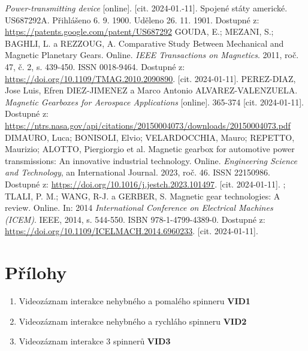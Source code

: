 \documentclass[12pt, a4paper,
 twoside,        %
 openright
]{report}
\begin{document}
\begin{thebibliography}{99}
     \textit{Power-transmitting device} [online]. [cit. 2024-01.-11]. Spojené státy americké. US687292A. Přihlášeno 6. 9. 1900. Uděleno 26. 11. 1901. Dostupné z: \url{https://patents.google.com/patent/US687292}
     GOUDA, E.; MEZANI, S.; BAGHLI, L. a REZZOUG, A. Comparative Study Between Mechanical and Magnetic Planetary Gears. Online. \textit{IEEE Transactions on Magnetics}. 2011, roč. 47, č. 2, s. 439-450. ISSN 0018-9464. Dostupné z: \url{https://doi.org/10.1109/TMAG.2010.2090890}. [cit. 2024-01-11].
     PEREZ-DIAZ, Jose Luis, Efren DIEZ-JIMENEZ a Marco Antonio ALVAREZ-VALENZUELA. \textit{Magnetic Gearboxes for Aerospace Applications} [online]. 365-374 [cit. 2024-01-11]. Dostupné z: \url{https://ntrs.nasa.gov/api/citations/20150004073/downloads/20150004073.pdf}
     DIMAURO, Luca; BONISOLI, Elvio; VELARDOCCHIA, Mauro; REPETTO, Maurizio; ALOTTO, Piergiorgio et al. Magnetic gearbox for automotive power transmissions: An innovative industrial technology. Online. \textit{Engineering Science and Technology}, an International Journal. 2023, roč. 46. ISSN 22150986. Dostupné z: \url{https://doi.org/10.1016/j.jestch.2023.101497}. [cit. 2024-01-11].
;    TLALI, P. M.; WANG, R-J. a GERBER, S. Magnetic gear technologies: A review. Online. In: 2014 \textit{International Conference on Electrical Machines (ICEM)}. IEEE, 2014, s. 544-550. ISBN 978-1-4799-4389-0. Dostupné z: \url{https://doi.org/10.1109/ICELMACH.2014.6960233}. [cit. 2024-01-11].
\end{thebibliography}

\listoffigures

\listoftables

\lstlistoflistings


\chapter*{Přílohy}
\begin{enumerate}[topsep=0pt, partopsep=0pt]
    \setlength{\itemsep}{0pt}%
    \setlength{\parskip}{0pt}%
    \item \label{attachment_1} Videozáznam interakce nehybného a pomalého spinneru \dotfill \textbf{VID1}
    \item \label{attachment_2} Videozáznam interakce nehybného a rychláho spinneru \dotfill \textbf{VID2}
    \item \label{attachment_3} Videozáznam interakce 3 spinnerů \dotfill \textbf{VID3}
\end{enumerate}
\end{document}
